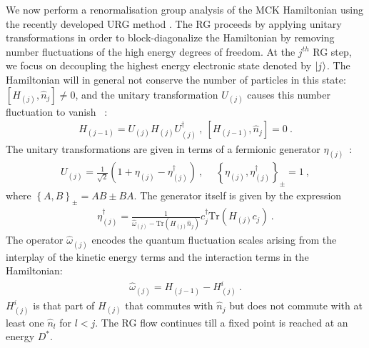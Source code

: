 \documentclass[reprint,prb,superscriptaddress]{revtex4-2}
\begin{document}
We now perform a renormalisation group analysis of the MCK Hamiltonian using the recently developed URG method \cite{anirbanmott1,anirbanmott2,anirbanurg1,anirbanurg2,siddharthacpi,santanukagome,1dhubjhep}.
The RG proceeds {by applying unitary transformations in order to block-diagonalize the Hamiltonian by removing number fluctuations of the high energy degrees of freedom}.
At the $j^{th}$ RG step, we focus on decoupling the highest energy electronic state denoted by $\ket{j}$.
The Hamiltonian will in general not conserve the number of particles in this state: \(\left[H_{(j)}, \hat n_{j}\right] \neq 0\), and the unitary transformation \(U_{(j)}\) causes this number fluctuation to vanish
~\cite{anirbanurg1,anirbanurg2}:
\begin{equation}\begin{aligned}
	H_{(j-1)} = U_{(j)} H_{(j)} U^\dagger_{(j)}~, ~\left[H_{(j-1)}, \hat n_{j}\right] =0~.
\end{aligned}\end{equation}
The unitary transformations are given in terms of a fermionic generator \(\eta_{(j)}\)~\cite{anirbanurg1,anirbanurg2}:
\begin{equation}\begin{aligned}
	U_{(j)} = \frac{1}{\sqrt 2}\left(1 + \eta_{(j)} - \eta_{(j)}^\dagger\right)~,~ \quad\left\{ \eta_{(j)},\eta_{(j)}^\dagger \right\}_\pm = 1~,
\end{aligned}\end{equation}
where \(\left\{A,B\right\}_\pm = AB \pm BA\). The generator itself is given by the expression~\cite{anirbanurg1,anirbanurg2}
\begin{equation}\begin{aligned}
	\eta^\dagger_{(j)} = \frac{1}{\hat \omega_{(j)} - \text{Tr}\left(H_{(j)} \hat n_{j}\right) } c^\dagger_{j} \text{Tr}\left(H_{(j)}c_{j}\right)~.
\end{aligned}\end{equation}
The operator \(\hat \omega_{(j)}\) encodes the quantum fluctuation scales arising from the interplay of the kinetic energy terms and the interaction terms in the Hamiltonian:
\begin{equation}\begin{aligned}
	\hat \omega_{(j)} = H_{(j-1)} - H^i_{(j)}~.
\end{aligned}\end{equation}
\(H^i_{(j)}\) is that part of \(H_{(j)}\) that commutes with \(\hat n_j\) but does not commute with at least one \(\hat n_l\) for \(l < j\). The RG flow continues till a fixed point is reached at an energy \(D^*\).
\end{document}
